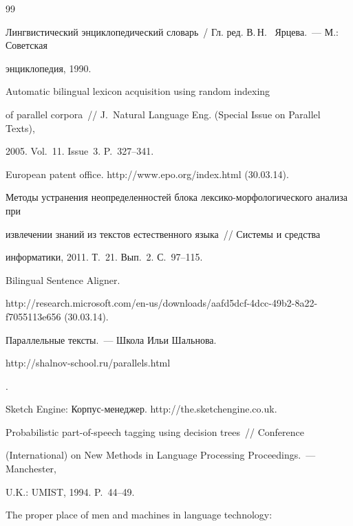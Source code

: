 {{\begin{thebibliography}{99}


Лингвистический энциклопедический словарь~/ Гл. ред. В.\,Н.~ Ярцева.~--- М.: Советская


энциклопедия, 1990.




 Automatic bilingual lexicon acquisition using random indexing


of parallel corpora~/\!\!/ J.~Natural Language Eng. (Special Issue on Parallel Texts),


2005. Vol.~11. Issue~3. P.~327--341.




European patent office. {\sf http://www.epo.org/index.html} (30.03.14).






Методы устранения неопределенностей блока лексико-морфологического анализа при


извлечении знаний из текстов естественного языка~/\!\!/ Системы и средства


информатики, 2011. Т.~21. Вып.~2. С.~97--115.




Bilingual Sentence Aligner.


{\sf http://research.microsoft.com/en-us/downloads/\linebreak aafd5dcf-4dcc-49b2-8a22-f7055113e656} (30.03.14).




Параллельные тексты.~--- Школа Ильи Шальнова. {\sf


http://shalnov-school.ru/parallels.html}.




Sketch Engine: Корпус-менеджер. {\sf http://the.sketchengine.co.uk}.




 Probabilistic part-of-speech tagging using decision trees~/\!\!/ Conference


(International) on New Methods in Language Processing Proceedings.~--- Manchester,


U.K.: UMIST, 1994. P.~44--49.




 The proper place of men and machines in language technology:



\end{thebibliography}}}
